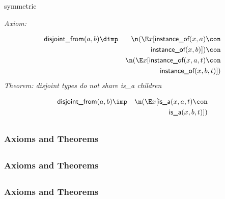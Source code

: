 \begin{clist}
\item symmetric
\end{clist}

\emph{Axiom: }

\begin{eqnarray*}
 \pr{disjoint\_from}(a, b) &\dimp & \n( \E x[ \pr{instance\_of}(x, a) \con \\
&& \pr{instance\_of}(x, b) ])\con \\
&& \n( \E x[ \pr{instance\_of}(x, a, t) \con \\
&& \pr{instance\_of}(x, b, t) ])
\end{eqnarray*}
\emph{Theorem: disjoint types do not share is\_a children}

\begin{eqnarray*}
 \pr{disjoint\_from}(a, b) &\imp & \n( \E x[ \pr{is\_a}(x, a, t) \con \\
&& \pr{is\_a}(x, b, t) ])
\end{eqnarray*}

\subsection{ }
\subsubsection{Axioms and Theorems}



\subsection{ }
\subsubsection{Axioms and Theorems}



\subsection{ }
\subsubsection{Axioms and Theorems}



\subsection{ }
